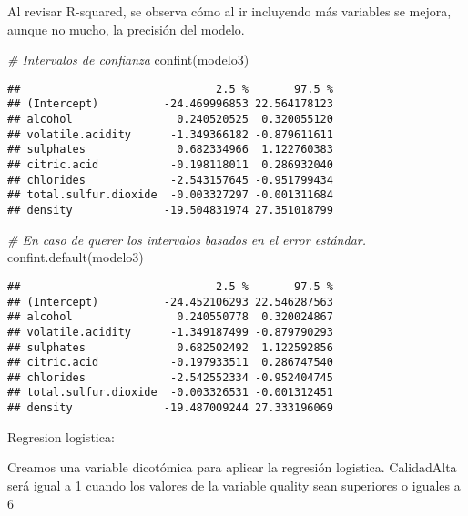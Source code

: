 \documentclass[
]{article}
\newenvironment{Shaded}{\begin{snugshade}}{\end{snugshade}}
\newcommand{\CommentTok}[1]{\textcolor[rgb]{0.56,0.35,0.01}{\textit{#1}}}
\newcommand{\DecValTok}[1]{\textcolor[rgb]{0.00,0.00,0.81}{#1}}
\newcommand{\FunctionTok}[1]{\textcolor[rgb]{0.00,0.00,0.00}{#1}}
\newcommand{\NormalTok}[1]{#1}
\newcommand{\OtherTok}[1]{\textcolor[rgb]{0.56,0.35,0.01}{#1}}
\newcommand{\SpecialCharTok}[1]{\textcolor[rgb]{0.00,0.00,0.00}{#1}}
\begin{document}
Al revisar R-squared, se observa cómo al ir incluyendo más variables se
mejora, aunque no mucho, la precisión del modelo.

\begin{Shaded}
\begin{Highlighting}[]
\CommentTok{\# Intervalos de confianza}
\FunctionTok{confint}\NormalTok{(modelo3)}
\end{Highlighting}
\end{Shaded}

\begin{verbatim}
##                              2.5 %       97.5 %
## (Intercept)          -24.469996853 22.564178123
## alcohol                0.240520525  0.320055120
## volatile.acidity      -1.349366182 -0.879611611
## sulphates              0.682334966  1.122760383
## citric.acid           -0.198118011  0.286932040
## chlorides             -2.543157645 -0.951799434
## total.sulfur.dioxide  -0.003327297 -0.001311684
## density              -19.504831974 27.351018799
\end{verbatim}

\begin{Shaded}
\begin{Highlighting}[]
\CommentTok{\# En caso de querer los intervalos basados en el error estándar.}
\FunctionTok{confint.default}\NormalTok{(modelo3)}
\end{Highlighting}
\end{Shaded}

\begin{verbatim}
##                              2.5 %       97.5 %
## (Intercept)          -24.452106293 22.546287563
## alcohol                0.240550778  0.320024867
## volatile.acidity      -1.349187499 -0.879790293
## sulphates              0.682502492  1.122592856
## citric.acid           -0.197933511  0.286747540
## chlorides             -2.542552334 -0.952404745
## total.sulfur.dioxide  -0.003326531 -0.001312451
## density              -19.487009244 27.333196069
\end{verbatim}

Regresion logistica:

Creamos una variable dicotómica para aplicar la regresión logistica.
CalidadAlta será igual a 1 cuando los valores de la variable quality
sean superiores o iguales a 6

\begin{Shaded}
\end{Shaded}
\end{document}
